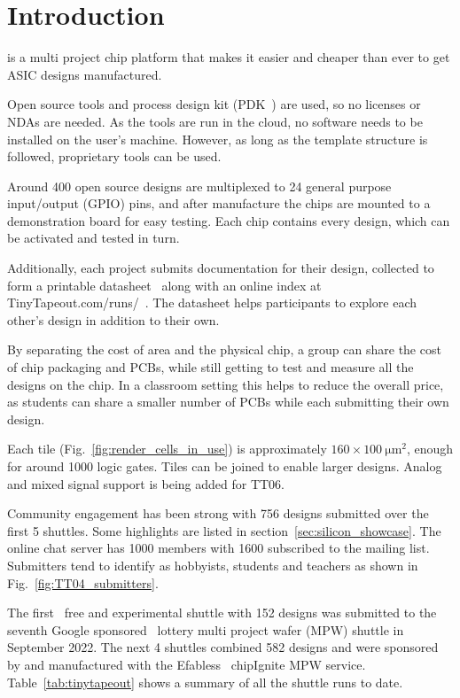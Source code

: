 \section{Introduction}
\label{sec:introduction}
 is a multi project chip platform that makes it easier and cheaper than ever to get ASIC designs manufactured.

Open source tools and process design kit (PDK~\cite{pdk}) are used, so no licenses or NDAs are needed. As the tools are run in the cloud, no software needs to be installed on the user's machine. However, as long as the template structure is followed, proprietary tools can be used.

Around 400 open source designs are multiplexed to 24 general purpose input/output (GPIO) pins, and after manufacture the chips are mounted to a demonstration board for easy testing. Each chip contains every design, which can be activated and tested in turn.

Additionally, each project submits documentation for their design, collected to form a printable datasheet~\cite{datasheet} along with an online index at TinyTapeout.com/runs/~\cite{tinytapeoutruns}. The datasheet helps participants to explore each other's design in addition to their own.

By separating the cost of area and the physical chip, a group can share the cost of chip packaging and PCBs, while still getting to test and measure all the designs on the chip. In a classroom setting this helps to reduce the overall price, as students can share a smaller number of PCBs while each submitting their own design.

Each tile (Fig.~\ref{fig:render_cells_in_use}) is approximately $160 \times \qty{100}{\micro\meter\squared}$, enough for around 1000 logic gates. Tiles can be joined to enable larger designs. Analog and mixed signal support is being added for TT06.

Community engagement has been strong with 756 designs submitted over the first 5 shuttles. Some highlights are listed in section~\ref{sec:silicon_showcase}.
The online chat server has 1000 members with 1600 subscribed to the mailing list. Submitters tend to identify as hobbyists, students and teachers as shown in Fig.~\ref{fig:TT04_submitters}.

The first~\cite{firstshuttle} free and experimental shuttle with 152 designs was submitted to the seventh Google sponsored~\cite{googlesponsored} lottery multi project wafer (MPW) shuttle in September 2022.
The next 4 shuttles combined 582 designs and were sponsored by and manufactured with the Efabless~\cite{efabless} chipIgnite MPW service. Table~\ref{tab:tinytapeout} shows a summary of all the shuttle runs to date.

